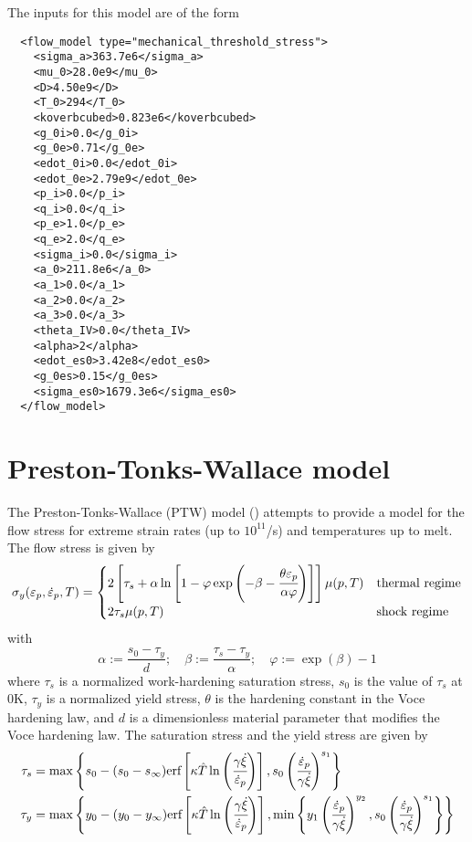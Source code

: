 The inputs for this model are of the form
\lstset{language=XML}
\begin{lstlisting}
  <flow_model type="mechanical_threshold_stress">
    <sigma_a>363.7e6</sigma_a>
    <mu_0>28.0e9</mu_0>
    <D>4.50e9</D>
    <T_0>294</T_0>
    <koverbcubed>0.823e6</koverbcubed>
    <g_0i>0.0</g_0i>
    <g_0e>0.71</g_0e>
    <edot_0i>0.0</edot_0i>
    <edot_0e>2.79e9</edot_0e>
    <p_i>0.0</p_i>
    <q_i>0.0</q_i>
    <p_e>1.0</p_e>
    <q_e>2.0</q_e>
    <sigma_i>0.0</sigma_i>
    <a_0>211.8e6</a_0>
    <a_1>0.0</a_1>
    <a_2>0.0</a_2>
    <a_3>0.0</a_3>
    <theta_IV>0.0</theta_IV>
    <alpha>2</alpha>
    <edot_es0>3.42e8</edot_es0>
    <g_0es>0.15</g_0es>
    <sigma_es0>1679.3e6</sigma_es0>
  </flow_model>
\end{lstlisting}

\section{Preston-Tonks-Wallace model}
The Preston-Tonks-Wallace (PTW) model (\cite{Preston2003}) attempts to 
provide a model for the flow stress for extreme strain rates 
(up to $10^{11}$/s) and temperatures up to melt.  The flow stress is
given by
\begin{equation}
  \sigma_y(\varepsilon_p,\dot{\varepsilon}_{p},T) = 
     \begin{cases}
       2\left[\tau_s + \alpha\ln\left[1 - \varphi
        \exp\left(-\beta-\cfrac{\theta\varepsilon_p}{\alpha\varphi}\right)\right]\right]
       \mu(p,T) & \text{thermal regime} \\
       2\tau_s\mu(p,T) & \text{shock regime}
     \end{cases}
\end{equation}
with 
\begin{equation}
  \alpha := \frac{s_0 - \tau_y}{d}; \quad
  \beta := \frac{\tau_s - \tau_y}{\alpha}; \quad
  \varphi := \exp(\beta) - 1
\end{equation}
where $\tau_s$ is a normalized work-hardening saturation stress,
$s_0$ is the value of $\tau_s$ at 0K,
$\tau_y$ is a normalized yield stress, $\theta$ is the hardening constant
in the Voce hardening law, and $d$ is a dimensionless material
parameter that modifies the Voce hardening law.  The saturation stress
and the yield stress are given by
\begin{align}
  \tau_s & = \max\left\{s_0 - (s_0 - s_{\infty})
     \text{erf}\left[\kappa
       \hat{T}\ln\left(\cfrac{\gamma\dot{\xi}}{\dot{\varepsilon}_{p}}\right)\right],
     s_0\left(\cfrac{\dot{\varepsilon}_{p}}{\gamma\dot{\xi}}\right)^{s_1}\right\} \\
  \tau_y & = \max\left\{y_0 - (y_0 - y_{\infty})
     \text{erf}\left[\kappa
       \hat{T}\ln\left(\cfrac{\gamma\dot{\xi}}{\dot{\varepsilon}_{p}}\right)\right],
     \min\left\{
       y_1\left(\cfrac{\dot{\varepsilon}_{p}}{\gamma\dot{\xi}}\right)^{y_2}, 
       s_0\left(\cfrac{\dot{\varepsilon}_{p}}{\gamma\dot{\xi}}\right)^{s_1}\right\}\right\} 
\end{align}
